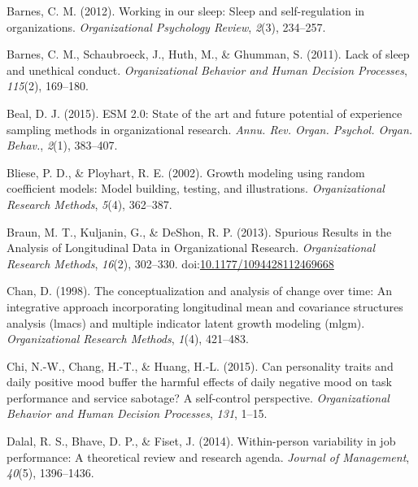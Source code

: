\documentclass[english,,man]{apa6}
\theoremstyle{definition}
\theoremstyle{definition}
\theoremstyle{definition}
\theoremstyle{remark}
\begin{document}
\setlength{\parindent}{-0.5in}
\setlength{\leftskip}{0.5in}

\hypertarget{refs}{}
\leavevmode\hypertarget{ref-barnes2012working}{}%
Barnes, C. M. (2012). Working in our sleep: Sleep and self-regulation in
organizations. \emph{Organizational Psychology Review}, \emph{2}(3),
234--257.

\leavevmode\hypertarget{ref-barnes_lack_2011}{}%
Barnes, C. M., Schaubroeck, J., Huth, M., \& Ghumman, S. (2011). Lack of
sleep and unethical conduct. \emph{Organizational Behavior and Human
Decision Processes}, \emph{115}(2), 169--180.

\leavevmode\hypertarget{ref-beal_esm_2015}{}%
Beal, D. J. (2015). ESM 2.0: State of the art and future potential of
experience sampling methods in organizational research. \emph{Annu. Rev.
Organ. Psychol. Organ. Behav.}, \emph{2}(1), 383--407.

\leavevmode\hypertarget{ref-bliese_growth_2002}{}%
Bliese, P. D., \& Ployhart, R. E. (2002). Growth modeling using random
coefficient models: Model building, testing, and illustrations.
\emph{Organizational Research Methods}, \emph{5}(4), 362--387.

\leavevmode\hypertarget{ref-braun_spurious_2013}{}%
Braun, M. T., Kuljanin, G., \& DeShon, R. P. (2013). Spurious Results in
the Analysis of Longitudinal Data in Organizational Research.
\emph{Organizational Research Methods}, \emph{16}(2), 302--330.
doi:\href{https://doi.org/10.1177/1094428112469668}{10.1177/1094428112469668}

\leavevmode\hypertarget{ref-chan1998conceptualization}{}%
Chan, D. (1998). The conceptualization and analysis of change over time:
An integrative approach incorporating longitudinal mean and covariance
structures analysis (lmacs) and multiple indicator latent growth
modeling (mlgm). \emph{Organizational Research Methods}, \emph{1}(4),
421--483.

\leavevmode\hypertarget{ref-chi_can_2015}{}%
Chi, N.-W., Chang, H.-T., \& Huang, H.-L. (2015). Can personality traits
and daily positive mood buffer the harmful effects of daily negative
mood on task performance and service sabotage? A self-control
perspective. \emph{Organizational Behavior and Human Decision
Processes}, \emph{131}, 1--15.

\leavevmode\hypertarget{ref-dalal2014within}{}%
Dalal, R. S., Bhave, D. P., \& Fiset, J. (2014). Within-person
variability in job performance: A theoretical review and research
agenda. \emph{Journal of Management}, \emph{40}(5), 1396--1436.
\end{document}
